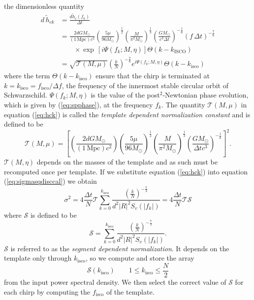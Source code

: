 the dimensionless quantity
\begin{equation}
\begin{split}
\label{eq:hck}
d\,\tilde{h}_{ck} &= \frac{d \tilde{h}_c(f_k)}{\Delta t} \\
&= 
\frac{2dGM_\odot}{(1\,\mathrm{Mpc}) c^2}
\left(\frac{5\mu}{96M_\odot}\right)^\frac{1}{2}
\left(\frac{M}{\pi^2M_\odot}\right)^\frac{1}{3}
\left(\frac{GM_\odot}{c^3\Delta t}\right)^{-\frac{1}{6}}
\left( f\,\Delta t \right)^{-\frac{7}{6}} \\
&\quad\quad\times\exp\,[i\Psi(f_k;M,\eta)] \Theta\left(k-k_\mathrm{ISCO}\right)\\
&=
\sqrt{\mathcal{T}(M,\mu)}\left(\frac{k}{N}\right)^{-\frac{7}{6}}
e^{i\Psi\left(f_k;M,\eta\right)} \Theta\left(k-k_\mathrm{isco}\right)
\end{split}
\end{equation}
where the term $\Theta\left(k-k_\mathrm{isco}\right)$ ensure that the chirp is
terminated at $k = k_\mathrm{isco} = f_\mathrm{isco} / \Delta f$, the
frequency of the innermost stable circular orbit of Schwarzschild.
$\Psi(f_k;M,\eta)$ is the value of the post$^2$-Newtonian phase evolution,
which is given by (\ref{eq:spphase}), at the frequency $f_k$. The quantity
$\mathcal{T}(M,\mu)$ in equation (\ref{eq:hck}) is called the \emph{template
dependent normalization constant} and is defined to be 
\begin{equation}
\mathcal{T}(M,\mu) = \left[
\left(\frac{2dGM_\odot}{(1\,\mathrm{Mpc})c^2}\right)
\left(\frac{5\mu}{96M_\odot}\right)^\frac{1}{2}
\left(\frac{M}{\pi^2M_\odot}\right)^\frac{1}{3}
\left(\frac{GM_\odot}{\Delta tc^3}\right)^{-\frac{1}{6}}
\right]^2.
\end{equation}
$\mathcal{T}(M,\eta)$ depends on the masses of the template and as such must
be recomputed once per template. If we substitute equation (\ref{eq:hck}) 
into equation (\ref{eq:sigmasqdisccal}) we obtain
\begin{equation}
\sigma^2 = 4 \frac{\Delta t}{N} \mathcal{T} 
\sum_{k=0}^{k_\mathrm{isco}} 
\frac{\left(\frac{k}{N}\right)^{-\frac{7}{3}}}
{d^2|R|^2S_v\left(\left|f_k\right|\right)}
= 4 \frac{\Delta t}{N} \mathcal{T} \mathcal{S}
\end{equation}
where $\mathcal{S}$ is defined to be
\begin{equation}
\mathcal{S} = 
\sum_{k=0}^{k_\mathrm{isco}} 
\frac{\left(\frac{k}{N}\right)^{-\frac{7}{3}}}{d^2|R|^2S_v\left(\left|f_k\right|\right)}.
\end{equation}
$\mathcal{S}$ is referred to as the \emph{segment dependent normalization}.
It depends on the template only through $k_\mathrm{isco}$, so we compute and
store the array 
\begin{equation}
\mathcal{S}(k_\mathrm{isco}) \quad \quad 1 \le k_\mathrm{isco} \le \frac{N}{2}
\end{equation}
from the input power spectral density. We then select the correct value of
$\mathcal{S}$ for each chirp by computing the $f_\mathrm{isco}$ of the
template.

